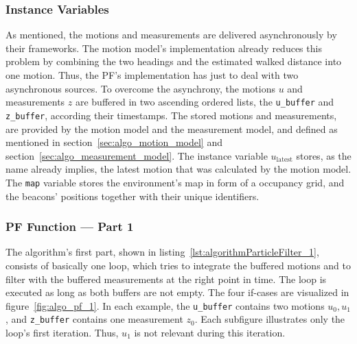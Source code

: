 \subsubsection*{Instance Variables}
As mentioned, the motions and measurements are delivered asynchronously by their frameworks. The motion model's implementation already reduces this problem by combining the two headings and the estimated walked distance into one motion. Thus, the \acs{PF}'s implementation has just to deal with two asynchronous sources. To overcome the asynchrony, the motions $u$ and measurements $z$ are buffered in two ascending ordered lists, the \texttt{u\_buffer} and \texttt{z\_buffer}, according their timestamps. The stored motions and measurements, are provided by the motion model and the measurement model, and defined as mentioned in section~\ref{sec:algo_motion_model} and section~\ref{sec:algo_measurement_model}. The instance variable $u_\text{latest}$ stores, as the name already implies, the latest motion that was calculated by the motion model. The \texttt{map} variable stores the environment's map in form of a occupancy grid, and the beacons' positions together with their unique identifiers.


\subsubsection*{\acl{PF} Function --- Part 1}
The algorithm's first part, shown in listing~\ref{lst:algorithmParticleFilter_1}, consists of basically one loop, which tries to integrate the buffered motions and to filter with the buffered measurements at the right point in time. The loop is executed as long as both buffers are not empty. The four if-cases are visualized in figure~\ref{fig:algo_pf_1}. In each example, the \texttt{u\_buffer} contains two motions $u_0, u_1$, and \texttt{z\_buffer} contains one measurement $z_0$. Each subfigure illustrates only the loop's first iteration. Thus, $u_1$ is not relevant during this iteration.

